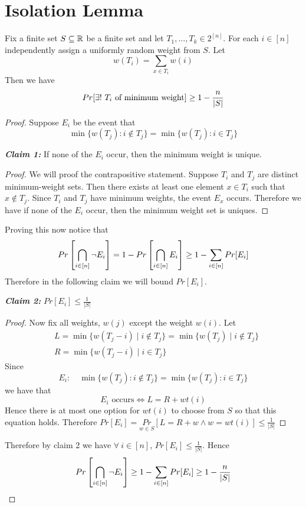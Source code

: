 \section{Isolation Lemma}
\begin{theorem}\label{isolation-lemma}
    Fix a finite set $S\subseteq \mathbb{R}$ be a finite set and let $T_1,\dots, T_k\in 2^{[n]}$. For each $i\in [n]$ independently assign a uniformly random weight from $S$.  Let $$w(T_i)=\sum_{x\in T_i}w(i)$$Then we have $$Pr[\exists!\ \text{$T_i$ of minimum weight}]\geq 1-\frac{n}{|S|}$$
\end{theorem}

\begin{proof}
    Suppose $E_i$ be the event that $$\min\{w(T_j)\colon i\notin T_j\}=\min \{w(T_j)\colon i\in T_j\} $$\parinf\vspace*{2mm}

    \textbf{\textit{Claim 1:}} If none of the $E_i$ occur, then the minimum weight is unique. 
    
    \begin{proof}
        We will proof the contrapositive statement. Suppose $T_i$ and $T_j$ are distinct minimum-weight sets. Then there exists at least one element $x\in T_i$ such that $x\notin T_j$. Since $T_i$ and $T_j$ have minimum weights, the event $E_x$ occurs. Therefore we have if none of the $E_i$ occur, then the minimum weight set is uniques.
    \end{proof}\vspace*{2mm}\parinn

    Proving this now notice that $$Pr\left[ \bigcap\limits_{i\in [n]} \neg E_i \right]=1-Pr\left[\bigcap\limits_{i\in[n]} E_i\right]\geq 1-\sum\limits_{i\in [n]}Pr[E_i]$$Therefore in the following claim we will bound $Pr[E_i]$. \parinf\vspace*{2mm}

    \textbf{\textit{Claim 2:}} $Pr[E_i]\leq \frac{1}{|S|}$ 
    
    \begin{proof}
        Now fix all weights, $w(j)$ except the weight $w(i)$. Let 
        \begin{align*}
        &L =\min\{w(T_j-i)\mid i\notin T_j\}=\min\{w(T_j)\mid i\notin T_j\}\\
         &R =\min \{w(T_j-i)\mid i\in T_j \}
        \end{align*}
        Since $$E_i:\quad \min\{w(T_j)\colon i\notin T_j\}=\min \{w(T_j)\colon i\in T_j\} $$
        we have that $$ E_i\text{ occurs}\iff L=R+wt(i)$$Hence there is at most  one option for $wt(i)$ to choose from $S$ so that this equation holds. Therefore $Pr[E_i]=\underset{w\in S }{Pr} [L=R+w\wedge w=wt(i)]\leq \frac1{|S|}$
    \end{proof}

Therefore by claim 2 we have $\forall\ i\in [n]$, $Pr[E_i]\leq\frac{1}{|S|}$. Hence $$Pr\left[ \bigcap\limits_{i\in[n]} \neg E_i \right]\geq 1-\sum\limits_{i\in[n]}^{} Pr[E_i]\geq 1-\frac{n}{|S|}$$ 
\end{proof}

